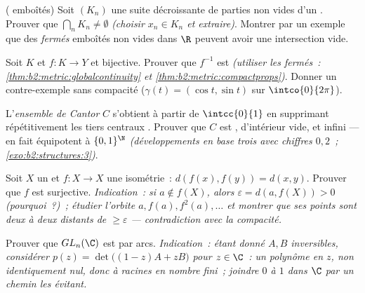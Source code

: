 \begin{exercise}[$\star\star$]\label{exo:b2:metric:6}
( emboîtés) Soit $(K_n)$ une suite décroissante de parties
 non vides d'un . Prouver que $\bigcap_n K_n
\neq \emptyset$ \emph{(choisir $x_n \in K_n$ et extraire)}. Montrer
par un exemple que des \emph{fermés} emboîtés non vides dans $\R$
peuvent avoir une intersection vide.
\end{exercise}

\begin{exercise}[$\star\star$]\label{exo:b2:metric:7}
Soit $K$  et $f \colon K \to Y$  et bijective.
Prouver que $f^{-1}$ est  \emph{(utiliser les fermés~:
\cref{thm:b2:metric:globalcontinuity} et
\cref{thm:b2:metric:compactprops})}. Donner un contre-exemple sans
compacité ($\gamma(t) = (\cos t, \sin t)$ sur $\intco{0}{2\pi}$).
\end{exercise}

\begin{exercise}[$\star\star$]\label{exo:b2:metric:8}
L'\emph{ensemble de Cantor} $C$ s'obtient à partir de $\intcc{0}{1}$
en supprimant répétitivement les tiers centraux . Prouver que
$C$ est , d'intérieur vide, et infini --- en fait équipotent à
$\{0,1\}^{\N}$ \emph{(développements en base trois avec chiffres
$0,2$~; \cref{exo:b2:structures:3})}.
\end{exercise}

\begin{exercise}[$\star\star\star$]\label{exo:b2:metric:9}
Soit $X$ un  \emph{} et $f \colon X \to X$ une
isométrie~: $d(f(x), f(y)) = d(x, y)$. Prouver que $f$ est
surjective. \emph{Indication~: si $a \notin f(X)$, alors $\varepsilon
= d(a, f(X)) > 0$ (pourquoi~?)~; étudier l'orbite $a, f(a), f^2(a),
\dots$ et montrer que ses points sont deux à deux distants de $\geq
\varepsilon$ --- contradiction avec la compacité.}
\end{exercise}

\begin{exercise}[$\star\star\star$]\label{exo:b2:metric:10}
Prouver que $GL_n(\C)$ est  par arcs. \emph{Indication~:
étant donné $A, B$ inversibles, considérer $p(z) = \det\bigl((1 -
z)A + zB\bigr)$ pour $z \in \C$~: un polynôme en $z$, non
identiquement nul, donc à racines en nombre fini~; joindre $0$ à $1$
dans $\C$ par un chemin les évitant.}
\end{exercise}

